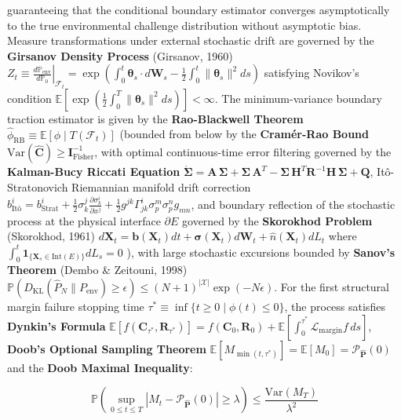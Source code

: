 \documentclass[11pt,a4paper]{article}
\theoremstyle{definition}\newtheorem{definition}{Definition}
\theoremstyle{remark}\newtheorem{remark}{Remark}
\begin{document}
guaranteeing that the conditional boundary estimator converges asymptotically to the true environmental challenge distribution without asymptotic bias. Measure transformations under external stochastic drift are governed by the \textbf{Girsanov Density Process} (Girsanov, 1960) $Z_t \equiv \left.\frac{d\mathbb{P}_{\text{env}}}{d\mathbb{P}_0}\right|_{\mathcal{F}_t} = \exp\left( \int_0^t \boldsymbol{\theta}_s \cdot d\mathbf{W}_s - \frac{1}{2}\int_0^t \|\boldsymbol{\theta}_s\|^2 ds \right)$ satisfying Novikov's condition $\mathbb{E}[\exp(\frac{1}{2}\int_0^T \|\boldsymbol{\theta}_s\|^2 ds)] < \infty$. The minimum-variance boundary traction estimator is given by the \textbf{Rao-Blackwell Theorem} $\hat{\phi}_{\text{RB}} \equiv \mathbb{E}[\phi \mid T(\mathcal{F}_t)]$ (bounded from below by the \textbf{Cramér-Rao Bound} $\mathrm{Var}(\hat{\mathbf{C}}) \ge \mathbf{I}_{\text{Fisher}}^{-1}$, with optimal continuous-time error filtering governed by the \textbf{Kalman-Bucy Riccati Equation} $\dot{\mathbf{\Sigma}} = \mathbf{A} \, \mathbf{\Sigma} + \mathbf{\Sigma} \, \mathbf{A}^T - \mathbf{\Sigma} \, \mathbf{H}^T\mathbf{R}^{-1}\mathbf{H} \, \mathbf{\Sigma} + \mathbf{Q}$, Itô-Stratonovich Riemannian manifold drift correction $b^i_{\text{It\^o}} = b^i_{\text{Strat}} + \frac{1}{2}\sigma^j_k \frac{\partial \sigma^i_k}{\partial x^j} + \frac{1}{2}g^{jk}\Gamma^i_{jk}\sigma^m_p \sigma^n_p g_{mn}$, and boundary reflection of the stochastic process at the physical interface $\partial E$ governed by the \textbf{Skorokhod Problem} (Skorokhod, 1961) $d\mathbf{X}_t = \mathbf{b}(\mathbf{X}_t)dt + \boldsymbol{\sigma}(\mathbf{X}_t)d\mathbf{W}_t + \hat{n}(\mathbf{X}_t)dL_t$ where $\int_0^t \mathbf{1}_{\{\mathbf{X}_s \in \mathrm{Int}(E)\}}dL_s = 0$ ), with large stochastic excursions bounded by \textbf{Sanov's Theorem} (Dembo \& Zeitouni, 1998) $\mathbb{P}(D_{\text{KL}}(\hat{P}_N \parallel P_{\text{env}}) \ge \epsilon) \le (N+1)^{|\mathcal{X}|} \exp(-N\epsilon)$. For the first structural margin failure stopping time $\tau^* \equiv \inf\{ t \ge 0 \mid \phi(t) \le 0 \}$, the process satisfies \textbf{Dynkin's Formula} $\mathbb{E}[f(\mathbf{C}_{\tau^*}, \mathbf{R}_{\tau^*})] = f(\mathbf{C}_0, \mathbf{R}_0) + \mathbb{E}[\int_0^{\tau^*} \mathcal{L}_{\text{margin}} f \, ds]$, \textbf{Doob's Optional Sampling Theorem} $\mathbb{E}[M_{\min(t, \tau^*)}] = \mathbb{E}[M_0] = \mathcal{P}_{\hat{\mathbf{P}}}(0)$ and the \textbf{Doob Maximal Inequality}:


\begin{equation}
\boxed{\mathbb{P}\left( \sup_{0 \le t \le T} \left| M_t - \mathcal{P}_{\hat{\mathbf{P}}}(0) \right| \ge \lambda \right) \le \frac{\mathrm{Var}(M_T)}{\lambda^2}}
\end{equation}
\end{document}
